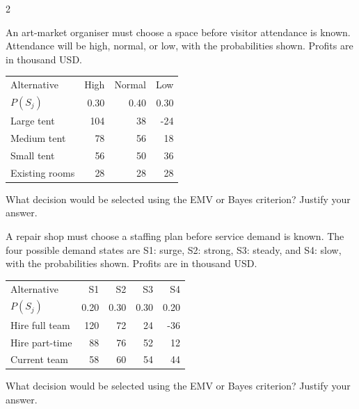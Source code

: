\begin{multicols}{2}
\begin{minipage}{\linewidth}
An art-market organiser must choose a space before visitor attendance is known. Attendance will be high, normal, or low, with the probabilities shown. Profits are in thousand USD.
\begin{center}\small\setlength{\tabcolsep}{4pt}
\begin{tabular}{@{}lrrr@{}}\toprule
Alternative&High&Normal&Low\\
$P(S_j)$&0.30&0.40&0.30\\\midrule
Large tent&104&38&-24\\
Medium tent&78&56&18\\
Small tent&56&50&36\\
Existing rooms&28&28&28\\\bottomrule
\end{tabular}\end{center}

What decision would be selected using the EMV or Bayes criterion? Justify your answer. 
\end{minipage}\par

\begin{minipage}{\linewidth}
A repair shop must choose a staffing plan before service demand is known. The four possible demand states are S1: surge, S2: strong, S3: steady, and S4: slow, with the probabilities shown. Profits are in thousand USD.
\begin{center}\small\setlength{\tabcolsep}{4pt}
\begin{tabular}{@{}lrrrr@{}}\toprule
Alternative&S1&S2&S3&S4\\
$P(S_j)$&0.20&0.30&0.30&0.20\\\midrule
Hire full team&120&72&24&-36\\
Hire part-time&88&76&52&12\\
Current team&58&60&54&44\\\bottomrule
\end{tabular}\end{center}

What decision would be selected using the EMV or Bayes criterion? Justify your answer. 
\end{minipage}\par



\end{multicols}
